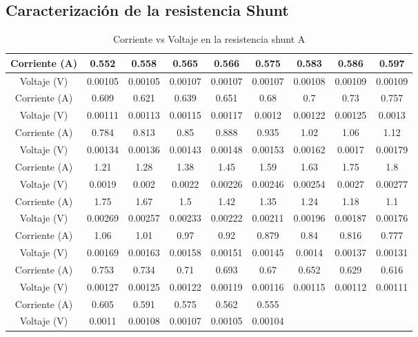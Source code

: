 \subsection{Caracterización de la resistencia Shunt}
\begin{table} [H]
    \begin{center}
    \begin{tabular}{ |c|c|c|c|c|c|c|c|c| }
        \hline 
        Corriente (A) & 0.552 & 0.558 & 0.565 & 0.566 & 0.575 & 0.583 & 0.586 & 0.597\\
        \hline
        Voltaje (V) & 0.00105 & 0.00105 & 0.00107 & 0.00107 & 0.00107 & 0.00108 & 0.00109 & 0.00109\\
        \hline
        \hline 
        Corriente (A) & 0.609 & 0.621 & 0.639 & 0.651 & 0.68 & 0.7 & 0.73 & 0.757\\
        \hline
        Voltaje (V) & 0.00111 & 0.00113 & 0.00115 & 0.00117 & 0.0012 & 0.00122 & 0.00125 & 0.0013\\
        \hline
        \hline 
        Corriente (A) & 0.784 & 0.813 & 0.85 & 0.888 & 0.935 & 1.02 & 1.06 & 1.12\\
        \hline
        Voltaje (V) & 0.00134 & 0.00136 & 0.00143 & 0.00148 & 0.00153 & 0.00162 & 0.0017 & 0.00179\\
        \hline
        \hline 
        Corriente (A) & 1.21 & 1.28 & 1.38 & 1.45 & 1.59 & 1.63 & 1.75 & 1.8\\
        \hline
        Voltaje (V) & 0.0019 & 0.002 & 0.0022 & 0.00226 & 0.00246 & 0.00254 & 0.0027 & 0.00277\\
        \hline
        \hline 
        Corriente (A) & 1.75 & 1.67 & 1.5 & 1.42 & 1.35 & 1.24 & 1.18 & 1.1\\
        \hline
        Voltaje (V) & 0.00269 & 0.00257 & 0.00233 & 0.00222 & 0.00211 & 0.00196 & 0.00187 & 0.00176\\
        \hline
        \hline 
        Corriente (A) & 1.06 & 1.01 & 0.97 & 0.92 & 0.879 & 0.84 & 0.816 & 0.777\\
        \hline
        Voltaje (V) & 0.00169 & 0.00163 & 0.00158 & 0.00151 & 0.00145 & 0.0014 & 0.00137 & 0.00131\\
        \hline
        \hline 
        Corriente (A) & 0.753 & 0.734 & 0.71 & 0.693 & 0.67 & 0.652 & 0.629 & 0.616\\
        \hline
        Voltaje (V) & 0.00127 & 0.00125 & 0.00122 & 0.00119 & 0.00116 & 0.00115 & 0.00112 & 0.00111\\
        \hline
        \hline
        Corriente (A) & 0.605 & 0.591 & 0.575 & 0.562 & 0.555 \\
        \hline
        Voltaje (V) & 0.0011 & 0.00108 & 0.00107 & 0.00105 & 0.00104 \\ 
        \hline
    \end{tabular}
\end{center}
\caption{Corriente vs Voltaje en la resistencia shunt A}
\label{tab:shuntA}
\end{table}

